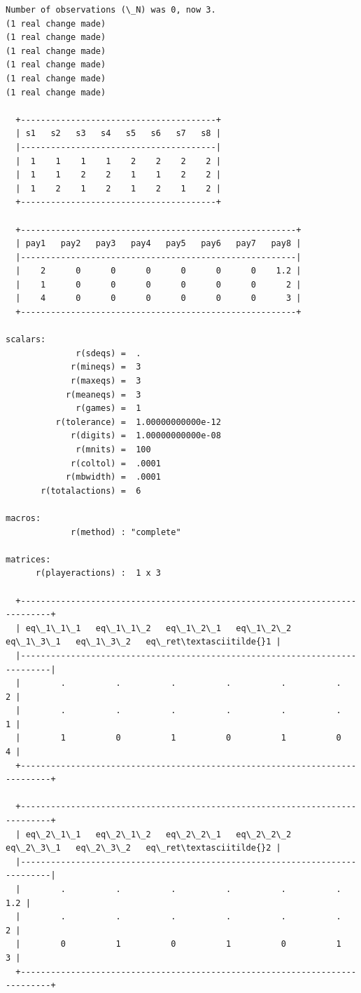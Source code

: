 \documentclass[11pt]{article}
\begin{document}
    \begin{Verbatim}[commandchars=\\\{\}]
Number of observations (\_N) was 0, now 3.
(1 real change made)
(1 real change made)
(1 real change made)
(1 real change made)
(1 real change made)
(1 real change made)

  +---------------------------------------+
  | s1   s2   s3   s4   s5   s6   s7   s8 |
  |---------------------------------------|
  |  1    1    1    1    2    2    2    2 |
  |  1    1    2    2    1    1    2    2 |
  |  1    2    1    2    1    2    1    2 |
  +---------------------------------------+

  +-------------------------------------------------------+
  | pay1   pay2   pay3   pay4   pay5   pay6   pay7   pay8 |
  |-------------------------------------------------------|
  |    2      0      0      0      0      0      0    1.2 |
  |    1      0      0      0      0      0      0      2 |
  |    4      0      0      0      0      0      0      3 |
  +-------------------------------------------------------+

scalars:
              r(sdeqs) =  .
             r(mineqs) =  3
             r(maxeqs) =  3
            r(meaneqs) =  3
              r(games) =  1
          r(tolerance) =  1.00000000000e-12
             r(digits) =  1.00000000000e-08
              r(mnits) =  100
             r(coltol) =  .0001
            r(mbwidth) =  .0001
       r(totalactions) =  6

macros:
             r(method) : "complete"

matrices:
      r(playeractions) :  1 x 3

  +----------------------------------------------------------------------------+
  | eq\_1\_1\_1   eq\_1\_1\_2   eq\_1\_2\_1   eq\_1\_2\_2   eq\_1\_3\_1   eq\_1\_3\_2   eq\_ret\textasciitilde{}1 |
  |----------------------------------------------------------------------------|
  |        .          .          .          .          .          .          2 |
  |        .          .          .          .          .          .          1 |
  |        1          0          1          0          1          0          4 |
  +----------------------------------------------------------------------------+

  +----------------------------------------------------------------------------+
  | eq\_2\_1\_1   eq\_2\_1\_2   eq\_2\_2\_1   eq\_2\_2\_2   eq\_2\_3\_1   eq\_2\_3\_2   eq\_ret\textasciitilde{}2 |
  |----------------------------------------------------------------------------|
  |        .          .          .          .          .          .        1.2 |
  |        .          .          .          .          .          .          2 |
  |        0          1          0          1          0          1          3 |
  +----------------------------------------------------------------------------+


\end{Verbatim}
\end{document}
